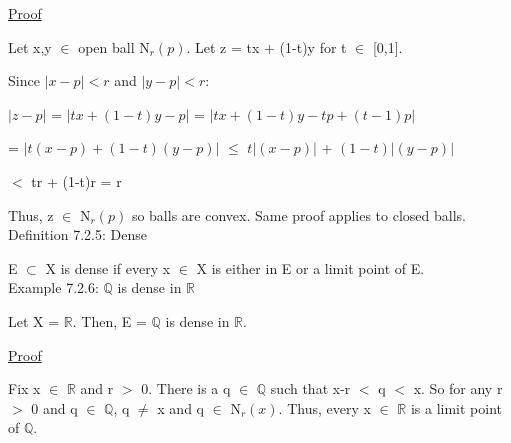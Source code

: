 { \color{magenta} \underline{Proof} }

	Let x,y $\in$ open ball N$_r(p)$. Let z = tx + (1-t)y for t $\in$ [0,1].
	
	Since $|x - p| < r$ and $|y - p| < r$:

	\hspace{1cm} $|z - p|$ = $|tx + (1-t)y - p|$ = $|tx + (1-t)y - tp + (t-1)p|$

	\hspace{2.3cm} = $|t(x-p) + (1-t)(y-p)|$ $\leq$ $t|(x-p)|$ + $(1-t)|(y-p)|$

	\hspace{2.3cm} $<$ tr + (1-t)r = r

	Thus, z $\in$ N$_r(p)$ so balls are convex. Same proof applies to closed balls. \\

{ \color{blue} Definition 7.2.5: Dense } 

	\begin{adjustbox}{minipage=14cm, right, vspace=0.1cm 0cm}
		E $\subset$ X is dense if every x $\in$ X is either in E or
		a limit point of E. \\
	\end{adjustbox}

{ \color{purple} Example 7.2.6: $\mathbb{Q}$ is dense in $\mathbb{R}$ } 

	\qquad Let X = $\mathbb{R}$.
	Then, E = $\mathbb{Q}$ is dense in $\mathbb{R}$.

{ \color{magenta} \underline{Proof} } 

	Fix x $\in$ $\mathbb{R}$ and r $>$ 0.
	There is a q $\in$ $\mathbb{Q}$ such that x-r $<$ q $<$ x.
	So for any r $>$ 0 and q $\in$ $\mathbb{Q}$, q $\neq$ x and
	q $\in$ N$_r(x)$.
	Thus, every x $\in$ $\mathbb{R}$ is a limit point of $\mathbb{Q}$. 




